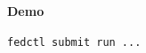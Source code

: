\documentclass[aspectratio=169,xcolor=dvipsnames]{beamer}
\begin{document}
\begin{frame}
    \Huge{\centerline{\textbf{Demo}}}
    \vspace{1.2em}
    \Large{\centerline{\texttt{fedctl submit run ...}}}
    \vspace{0.8em}
\end{frame}     

\end{document}

